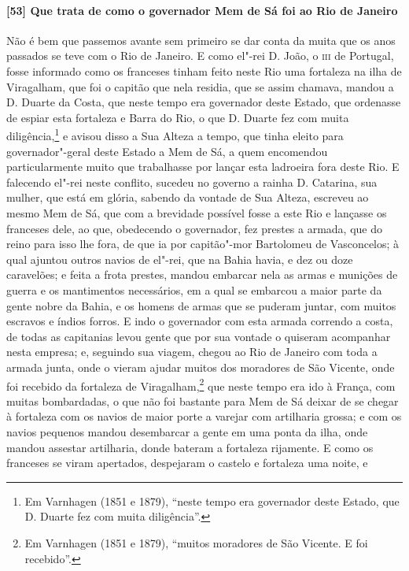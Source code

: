 \begin{linenumbers}
\paragraph{[53] Que trata de como o governador Mem de Sá foi ao Rio de Janeiro} \quad
Não é bem que passemos avante sem primeiro se dar conta da muita que os anos passados se
teve com o Rio de Janeiro. E como el"-rei D. João, o \textsc{iii} de Portugal, fosse
informado como os franceses tinham feito neste Rio uma fortaleza na ilha de Viragalham,
que foi o capitão que nela residia, que se assim chamava, mandou a D. Duarte da Costa, que
neste tempo era governador deste Estado, que ordenasse de espiar esta fortaleza e Barra do
Rio, o que D. Duarte fez com muita diligência,\footnote{ Em Varnhagen (1851 e 1879),
``neste tempo era governador deste Estado, que D. Duarte fez com muita diligência''.} e
avisou disso a Sua Alteza a tempo, que tinha eleito para governador"-geral deste Estado a
Mem de Sá, a quem encomendou particularmente muito que trabalhasse por lançar esta
ladroeira fora deste Rio. E falecendo el"-rei neste conflito, sucedeu no governo a rainha
D. Catarina, sua mulher, que está em glória, sabendo da vontade de Sua Alteza, escreveu ao
mesmo Mem de Sá, que com a brevidade possível fosse a este Rio e lançasse os franceses
dele, ao que, obedecendo o governador, fez prestes a armada, que do reino para isso lhe
fora, de que ia por capitão"-mor Bartolomeu de Vasconcelos; à qual ajuntou outros navios de
el"-rei, que na Bahia havia, e dez ou doze caravelões; e feita a frota prestes, mandou
embarcar nela as armas e munições de guerra e os mantimentos necessários, em a qual se
embarcou a maior parte da gente nobre da Bahia, e os homens de armas que se puderam
juntar, com muitos escravos e índios forros. E indo o governador com esta armada correndo
a costa, de todas as capitanias levou gente que por sua vontade o quiseram acompanhar
nesta empresa; e, seguindo sua viagem, chegou ao Rio de Janeiro com toda a armada junta,
onde o vieram ajudar muitos dos moradores de São Vicente, onde foi recebido da fortaleza
de Viragalham,\footnote{ Em Varnhagen (1851 e 1879), ``muitos moradores de São Vicente. E
foi recebido''.} que neste tempo era ido à França, com muitas bombardadas, o que não foi
bastante para Mem de Sá deixar de se chegar à fortaleza com os navios de maior porte a
varejar com artilharia grossa; e com os navios pequenos mandou desembarcar a gente em uma
ponta da ilha, onde mandou assestar artilharia, donde bateram a fortaleza rijamente. E
como os franceses se viram apertados, despejaram o castelo e fortaleza uma noite, e

\end{linenumbers}
